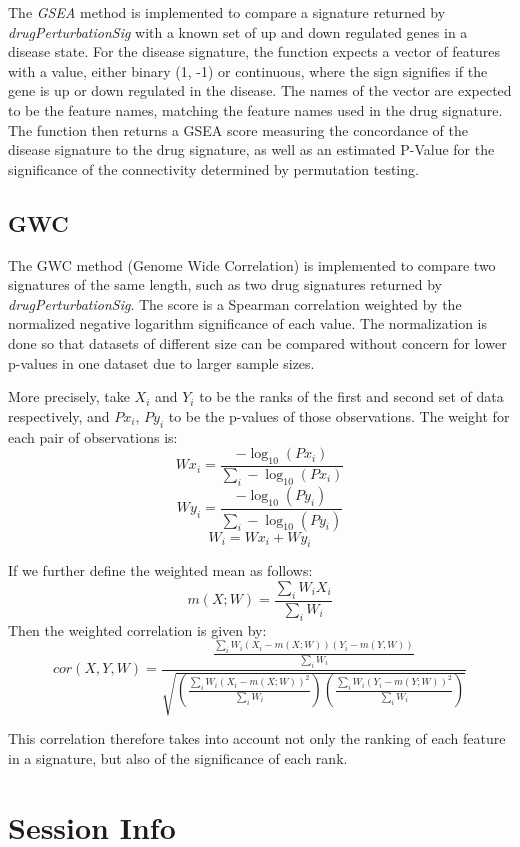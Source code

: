 \documentclass[11pt]{article}
\begin{document}
The \textit{GSEA} method is implemented to compare a signature returned by \textit{drugPerturbationSig} with a known set of up and down regulated genes in a disease state. For the disease signature, the function expects a vector of features with a value, either binary (1, -1) or continuous, where the sign signifies if the gene is up or down regulated in the disease. The names of the vector are expected to be the feature names, matching the feature names used in the drug signature. The function then returns a GSEA score measuring the concordance of the disease signature to the drug signature, as well as an estimated P-Value for the significance of the connectivity determined by permutation testing. 

\subsection{GWC}

The GWC method (Genome Wide Correlation) is implemented to compare two signatures of the same length, such as two drug signatures returned by \textit{drugPerturbationSig}. The score is a Spearman correlation weighted by the normalized negative logarithm significance of each value. The normalization is done so that datasets of different size can be compared without concern for lower p-values in one dataset due to larger sample sizes. 

More precisely, take $X_i$ and $Y_i$ to be the ranks of the first and second set of data respectively, and $Px_i$, $Py_i$ to be the p-values of those observations. The weight for each pair of observations is:
$$Wx_i = \frac{-\log_{10}(Px_i)}{\sum_{i}-\log_{10}(Px_i)}$$
$$Wy_i = \frac{-\log_{10}(Py_i)}{\sum_{i}-\log_{10}(Py_i)}$$
$$W_i = Wx_i + Wy_i$$

If we further define the weighted mean as follows:
$$ m(X;W) = \frac{\sum_i W_i X_i}{\sum_i{W_i}}$$
Then the weighted correlation is given by:
$$ cor(X,Y,W) = \frac{\frac{\sum_i W_i (X_i - m(X;W))(Y_i - m(Y,W))}{\sum_i W_i}}{\sqrt{(\frac{\sum_i W_i (X_i - m(X;W))^2}{\sum_i W_i})(\frac{\sum_i W_i (Y_i - m(Y;W))^2}{\sum_i W_i})}}$$

This correlation therefore takes into account not only the ranking of each feature in a signature, but also of the significance of each rank.

\section*{Session Info}
\end{document}
